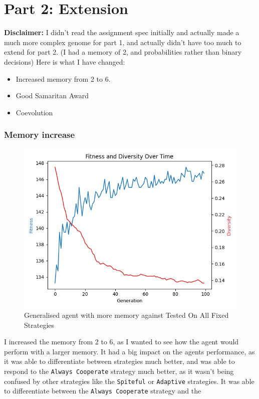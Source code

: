 \documentclass[11pt]{scrartcl} %
\begin{document}
\newpage
\section{Part 2: Extension}

\textbf{Disclaimer:} 
I didn't read the assignment spec initially and actually made a much more complex genome for part 1, and actually didn't have too much to extend for part 2. (I had a memory of 2, and probabilities rather than binary decisions)
Here is what I have changed:
\begin{itemize}
	\item Increased memory from 2 to 6.
	\item Good Samaritan Award
	\item Coevolution
\end{itemize}

\subsubsection{Memory increase}

\begin{figure}[H]
	\centering
	\includegraphics[width=0.8\linewidth]{Figures/part_2/extra_mem_gen.png}
	\caption{Generalised agent with more memory against Tested On All Fixed Strategies}
	\label{fig:extra_mem_gen_graph}
\end{figure}

I increased the memory from 2 to 6, as I wanted to see how the agent would perform with a larger memory.
It had a big impact on the agents performance, as it was able to differentiate between strategies much better, and was able to respond to the \texttt{Always Cooperate} strategy much better, as it wasn't being confused by other strategies like the \texttt{Spiteful} or \texttt{Adaptive} strategies.
It was able to differentiate between the \texttt{Always Cooperate} strategy and the
\end{document}
